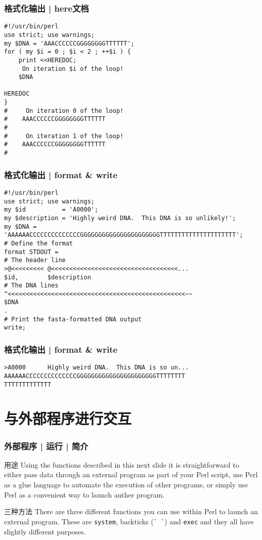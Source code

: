 \begin{frame}[fragile]
  \frametitle{格式化输出 | here文档}
\begin{lstlisting}
#!/usr/bin/perl
use strict; use warnings;
my $DNA = 'AAACCCCCCGGGGGGGGTTTTTT';
for ( my $i = 0 ; $i < 2 ; ++$i ) {
    print <<HEREDOC;
     On iteration $i of the loop!
    $DNA

HEREDOC
}
#     On iteration 0 of the loop!
#    AAACCCCCCGGGGGGGGTTTTTT
#
#     On iteration 1 of the loop!
#    AAACCCCCCGGGGGGGGTTTTTT
#
\end{lstlisting}
\end{frame}

\begin{frame}[fragile]
  \frametitle{格式化输出 | format \& write}
\begin{lstlisting}[basicstyle=\footnotesize\tt,numberstyle=\scriptsize]
#!/usr/bin/perl
use strict; use warnings;
my $id          = 'A0000';
my $description = 'Highly weird DNA.  This DNA is so unlikely!';
my $DNA = 'AAAAAACCCCCCCCCCCCCCGGGGGGGGGGGGGGGGGGGGGGTTTTTTTTTTTTTTTTTTTTT';
# Define the format
format STDOUT =
# The header line
>@<<<<<<<<< @<<<<<<<<<<<<<<<<<<<<<<<<<<<<<<<<<<<...
$id,        $description
# The DNA lines
^<<<<<<<<<<<<<<<<<<<<<<<<<<<<<<<<<<<<<<<<<<<<<<<<<~~
$DNA
.
# Print the fasta-formatted DNA output
write;
\end{lstlisting}
\end{frame}

\begin{frame}[fragile]
  \frametitle{格式化输出 | format \& write}
\begin{lstlisting}[basicstyle=\footnotesize\tt,numberstyle=\scriptsize]
>A0000      Highly weird DNA.  This DNA is so un...
AAAAAACCCCCCCCCCCCCCGGGGGGGGGGGGGGGGGGGGGGTTTTTTTT
TTTTTTTTTTTTT
\end{lstlisting}
\end{frame}

\section{与外部程序进行交互}
\begin{frame}[fragile]
  \frametitle{外部程序 | 运行 | 简介}
  \begin{block}{用途}
    Using the functions described in this next slide it is straightforward to either pass data through an external program as part of your Perl script, use Perl as a glue language to automate the execution of other programs, or simply use Perl as a convenient way to launch anther program.
  \end{block}
  \pause
  \begin{block}{三种方法}
    There are three different functions you can use within Perl to launch an external program. These are \verb|system|, backticks (\verb|` `|) and \verb|exec| and they all have slightly different purposes.
  \end{block}
\end{frame}

